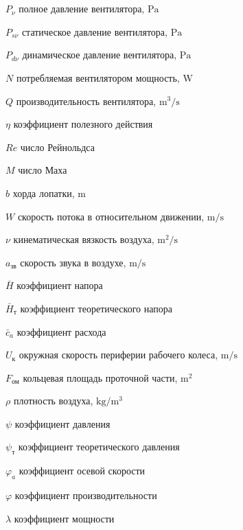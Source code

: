 \chapter*{\nomname}                         %
\eqexplSetIntro{}

\begin{eqexpl}
\item{\(P_\nu\)} полное давление вентилятора, \(\si\pascal\)
\item{\(P_{s\nu}\)} статическое давление вентилятора, \(\si\pascal\)
\item{\(P_{d\nu}\)} динамическое давление вентилятора, \(\si\pascal\)
\item{\(N\)} потребляемая вентилятором мощность, \(\si\watt\)
\item{\(Q\)} производительность вентилятора, $\si\meter^3/\si\second$
\item{\(\eta\)} коэффициент полезного действия 
\item{\(Re\)} число Рейнольдса
\item{\(M\)} число Маха
\item{\(b\)} хорда лопатки, $\si\meter$
\item{\(W\)} скорость потока в относительном движении, $\si\meter/\si\second$
\item{\(\nu\)} кинематическая вязкость воздуха, $\si\meter^2/\si\second$
\item{\(a_{\text{зв}}\)} скорость звука в воздухе, $\si\meter/\si\second$
\item{\(\bar{H}\)} коэффициент напора
\item{\(\bar{H}_{\text{т}}\)} коэффициент теоретического напора
\item{\(\bar{c}_{a}\)} коэффициент расхода
\item{\(U_\text{к}\)} окружная скорость периферии рабочего колеса, $\si\meter/\si\second$
\item{\(F_{\text{ом}}\)} кольцевая площадь проточной части, \(\si{\meter}^2\)
\item{\(\rho\)} плотность воздуха, \(\si{\kilogram}/\si{\meter}^3\)
\item{\(\psi\)}	коэффициент давления
\item{\(\psi_{\text{т}}\)} коэффициент теоретического давления
\item{\(\varphi_{a}\)} коэффициент осевой скорости
\item{\(\varphi\)} коэффициент производительности
\item{\(\lambda\)} коэффициент мощности

\end{eqexpl}

